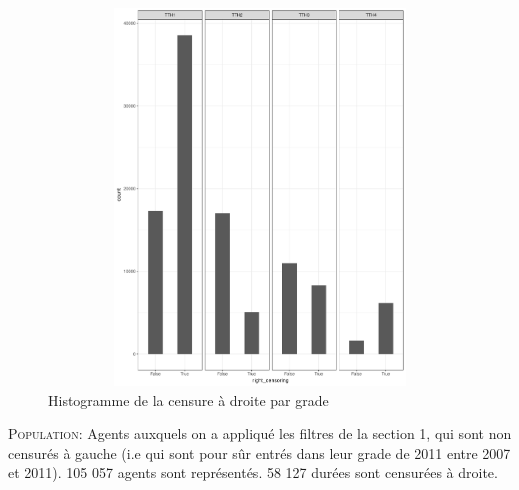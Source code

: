 \documentclass[11pt,a4paper]{article}
\begin{document}
\begin{figure}[H] 
	\caption{Histogramme de la censure à droite par grade}
	\label{transit1} 
	\includegraphics[width = 12cm, height=10cm, keepaspectratio]{right_censoring_par_grade_de_2011.pdf} 
\end{figure}
\begin{minipage}{15cm}
	\footnotesize
	\textsc{Population:} Agents auxquels on a appliqué les filtres de la section 1, qui sont non censurés à gauche (i.e qui sont pour sûr entrés dans leur grade de 2011 entre 2007 et 2011). 105 057 agents sont représentés. 58 127 durées sont censurées à droite.\\
\end{minipage}

\bigskip
\end{document}
